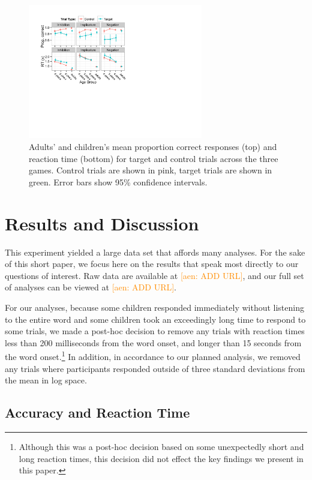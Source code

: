 \documentclass[10pt,letterpaper]{article}
\newcommand{\aen}[1]{\textcolor{DarkOrange}{[aen: #1]}}
\begin{document}
\begin{figure}
\begin{center} 
\includegraphics[width=3in]{figures/correct_RT.pdf}
\caption{\label{fig:traditional} Adults' and children's mean proportion correct responses (top) and reaction time (bottom) for target and control trials across the three games.  Control trials are shown in pink, target trials are shown in green.  Error bars show 95\% confidence intervals.  }
\end{center} 
\end{figure}



\section{Results and Discussion}

This experiment yielded a large data set that affords many analyses.  For the sake of this short paper, we focus here on the results that speak most directly to our questions of interest.  Raw data are available at \aen{ADD URL}, and our full set of analyses can be viewed at \aen{ADD URL}.  

For our analyses, because some children responded immediately without listening to the entire word and some children took an exceedingly long time to respond to some trials, we made a post-hoc decision to remove any trials with reaction times less than 200 milliseconds from the word onset, and longer than 15 seconds from the word onset.\footnote{Although this was a post-hoc decision based on some unexpectedly short and long reaction times, this decision did not effect the key findings we present in this paper.}  In addition, in accordance to our planned analysis, we removed any trials where participants responded outside of three standard deviations from the mean in log space.

\subsection{Accuracy and Reaction Time}
\end{document}
